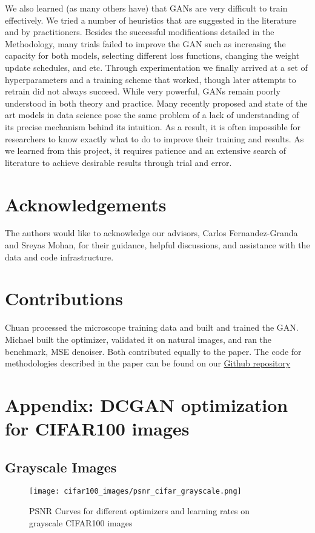 \documentclass{article}
\begin{document}
We also learned (as many others have) that GANs are very difficult to train effectively. We tried a number of heuristics that are suggested in the literature and by practitioners. Besides the successful modifications detailed in the Methodology, many trials failed to improve the GAN such as increasing the capacity for both models, selecting different loss functions, changing the weight update schedules, and etc. Through experimentation we finally arrived at a set of hyperparameters and a training scheme that worked, though later attempts to retrain did not always succeed. While very powerful, GANs remain poorly understood in both theory and practice. Many recently proposed and state of the art models in data science pose the same problem of a lack of understanding of its precise mechanism behind its intuition. As a result, it is often impossible for researchers to know exactly what to do to improve their training and results. As we learned from this project, it requires patience and an extensive search of literature to achieve desirable results through trial and error. 

\section*{Acknowledgements}
The authors would like to acknowledge our advisors, Carlos Fernandez-Granda and Sreyas Mohan, for their guidance, helpful discussions, and assistance with the data and code infrastructure.

\medskip

\small

\section*{Contributions}
Chuan processed the microscope training data and built and trained the GAN. Michael built the optimizer,  validated it on natural images, and ran the benchmark, MSE denoiser. Both contributed equally to the paper. The code for methodologies described in the paper can be found on our \hyperlink{https://github.com/cc6580/nanop_GAN}{Github repository}

\medskip

\appendix
\section{Appendix: DCGAN optimization for CIFAR100 images}

\subsection{Grayscale Images}
\begin{figure}[h!]
  \centering
  \texttt{[image: cifar100\_images/psnr\_cifar\_grayscale.png]}
  \caption{PSNR Curves for different optimizers and learning rates on grayscale CIFAR100 images}
  \label{fig:cifar_curve_gray}
\end{figure}
\FloatBarrier
\end{document}
